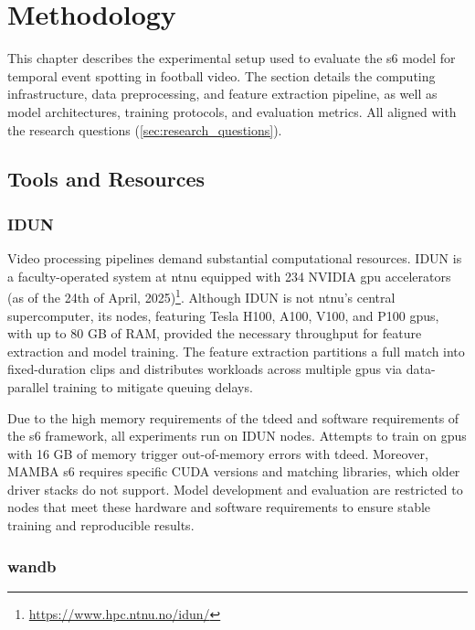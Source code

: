 \chapter{Methodology} 
\label{chap:methodology}
This chapter describes the experimental setup used to evaluate the \acrfull{s6} model for temporal event spotting in football video. The section details the computing infrastructure, data preprocessing, and feature extraction pipeline, as well as model architectures, training protocols, and evaluation metrics. All aligned with the research questions (\autoref{sec:research_questions}).


\section{Tools and Resources}
\label{sec:tools_and_resources}

\subsection{IDUN}
\label{ssec:idun}
Video processing pipelines demand substantial computational resources. IDUN is a faculty-operated system at \acrfull{ntnu} equipped with 234 NVIDIA \acrfull{gpu} accelerators (as of the 24th of April, 2025)\footnote{\url{https://www.hpc.ntnu.no/idun/}}. Although IDUN is not \acrshort{ntnu}'s central supercomputer, its nodes, featuring Tesla H100, A100, V100, and P100 \acrshort{gpu}s, with up to 80 GB of RAM, provided the necessary throughput for feature extraction and model training. The feature extraction partitions a full match into fixed-duration clips and distributes workloads across multiple \acrshort{gpu}s via data-parallel training to mitigate queuing delays.


Due to the high memory requirements of the \acrfull{tdeed} and software requirements of the \acrfull{s6} framework, all experiments run on IDUN nodes. Attempts to train on \acrshort{gpu}s with 16 GB of memory trigger out-of-memory errors with \acrshort{tdeed}. Moreover, MAMBA \acrshort{s6} requires specific CUDA versions and matching libraries, which older driver stacks do not support. Model development and evaluation are restricted to nodes that meet these hardware and software requirements to ensure stable training and reproducible results. 

\subsection{\acrfull{wandb}}
\label{ssec:wandb}

